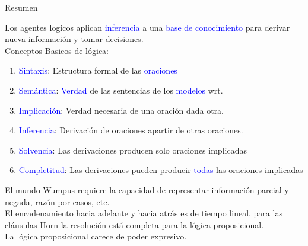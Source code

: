 \begin{frame}{Resumen}
\scriptsize{
Los agentes logicos aplican \textcolor{blue}{inferencia} a una \textcolor{blue}{base de conocimiento} para derivar nueva información y tomar decisiones.\\
\vspace{0.3cm}
Conceptos Basicos de lógica:
\begin{enumerate}
\item \textcolor{blue}{Sintaxis}: Estructura formal de las  \textcolor{blue}{oraciones}
\item \textcolor{blue}{Semántica}: \textcolor{blue}{Verdad} de las sentencias de los \textcolor{blue}{modelos} wrt.
\item \textcolor{blue}{Implicación}: Verdad necesaria de una oración dada otra.
\item \textcolor{blue}{Inferencia}: Derivación de oraciones apartir de otras oraciones.
\item \textcolor{blue}{Solvencia}: Las derivaciones producen solo oraciones implicadas
\item \textcolor{blue}{Completitud}: Las derivaciones pueden producir \textcolor{blue}{todas} las oraciones implicadas
\end{enumerate}
El mundo Wumpus requiere la capacidad de representar información parcial y negada, razón por casos, etc.\\ 
\vspace{0.3cm}
El encadenamiento hacia adelante y hacia atrás es de tiempo lineal, para las cláusulas Horn la resolución está completa para la lógica proposicional.\\ 
\vspace{0.3cm}
\hspace{1cm} La lógica proposicional carece de poder expresivo.
}
\end{frame}